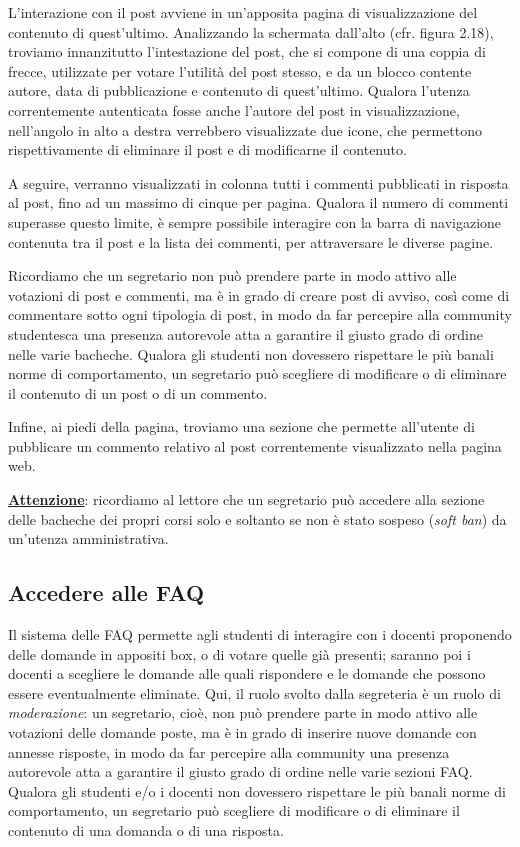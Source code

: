 \documentclass [a4paper,11pt]{book}
\begin{document}
L'interazione con il post avviene in un'apposita pagina di visualizzazione del contenuto di quest'ultimo. Analizzando la schermata dall'alto (cfr. figura 2.18), troviamo innanzitutto l'intestazione del post, che si compone di una coppia di frecce, utilizzate per votare l'utilità del post stesso, e da un blocco contente autore, data di pubblicazione e contenuto di quest'ultimo. Qualora l'utenza correntemente autenticata fosse anche l'autore del post in visualizzazione, nell'angolo in alto a destra verrebbero visualizzate due icone, che permettono rispettivamente di eliminare il post e di modificarne il contenuto.

A seguire, verranno visualizzati in colonna tutti i commenti pubblicati in risposta al post, fino ad un massimo di cinque per pagina. Qualora il numero di commenti superasse questo limite, è sempre possibile interagire con la barra di navigazione contenuta tra il post e la lista dei commenti, per attraversare le diverse pagine. 

Ricordiamo che un segretario non può prendere parte in modo attivo alle votazioni di post e commenti, ma è in grado di creare post di avviso, così come di commentare sotto ogni tipologia di post, in modo da far percepire alla community studentesca una presenza autorevole atta a garantire il giusto grado di ordine nelle varie bacheche. Qualora gli studenti non dovessero rispettare le più banali norme di comportamento, un segretario può scegliere di modificare o di eliminare il contenuto di un post o di un commento.

Infine, ai piedi della pagina, troviamo una sezione che permette all'utente di pubblicare un commento relativo al post correntemente visualizzato nella pagina web.

\medskip

\textbf{\underline{Attenzione}}: ricordiamo al lettore che un segretario può accedere alla sezione delle bacheche dei propri corsi solo e soltanto se non è stato sospeso (\emph{soft ban}) da un'utenza amministrativa.

\medskip

\subsection{Accedere alle FAQ}

Il sistema delle FAQ permette agli studenti di interagire con i docenti proponendo delle domande in appositi box, o di votare quelle già presenti; saranno poi i docenti a scegliere le domande alle quali rispondere e le domande che possono essere eventualmente eliminate. Qui, il ruolo svolto dalla segreteria è un ruolo di \emph{moderazione}: un segretario, cioè, non può prendere parte in modo attivo alle votazioni delle domande poste, ma è in grado di inserire nuove domande con annesse risposte, in modo da far percepire alla community una presenza autorevole atta a garantire il giusto grado di ordine nelle varie sezioni FAQ. Qualora gli studenti e/o i docenti non dovessero rispettare le più banali norme di comportamento, un segretario può scegliere di modificare o di eliminare il contenuto di una domanda o di una risposta.
\end{document}
